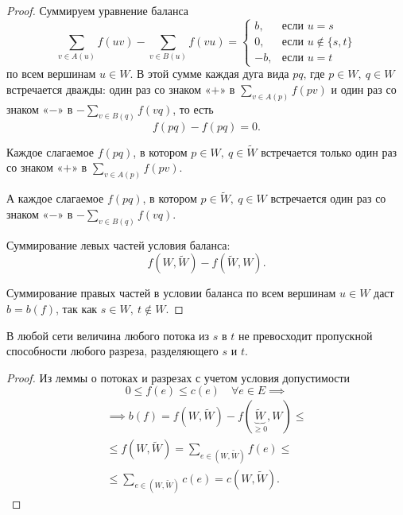 \begin{proof}
    Суммируем уравнение баланса
    \[
        \sum_{v\in A(u)}f(uv) - \sum_{v\in B(u)}f(vu) = \left\{\begin{array}{ll}
            b,  & \text{если }u = s            \\
            0,  & \text{если }u \notin \{s,t\} \\
            -b, & \text{если }u = t
        \end{array}\right.
    \]
    по всем вершинам $ u \in W $. В этой сумме каждая дуга вида $ pq $, где $ p \in W, \ q \in W $ встречается дважды: один раз со знаком «$+$» в $ \sum_{v \in A(p)}f(pv) $ и один раз со знаком «$-$» в $ -\sum_{v \in B(q)}f(vq) $, то есть
    \[
        f(pq) - f(pq) = 0.
    \]

    Каждое слагаемое $ f(pq) $, в котором $ p \in W, \ q \in \widetilde{W} $ встречается только один раз со знаком «$+$» в $ \sum_{v \in A(p)}f(pv) $.

    А каждое слагаемое $ f(pq) $, в котором $ p \in \widetilde{W}, \ q \in W $ встречается один раз со знаком «$-$» в $ -\sum_{v \in B(q)}f(vq) $.

    Суммирование левых частей условия баланса:
    \[
        f(W,\widetilde{W}) - f(\widetilde{W},W).
    \]

    Суммирование правых частей в условии баланса по всем вершинам $ u \in W $ даст $ b = b(f) $, так как $ s \in W, \ t \notin W $.
\end{proof}

\begin{corollary}
    В любой сети величина любого потока из $ s $ в $ t $ не превосходит пропускной способности любого разреза, разделяющего $ s $ и $ t $.
\end{corollary}

\begin{proof}
    Из леммы о потоках и разрезах с учетом условия допустимости
    \[
        0 \leqslant f(e) \leqslant c(e) \quad \forall e \in E \implies
    \]
    \begin{multline*}
        \implies b(f) = f(W,\widetilde{W}) - f(\underbrace{\widetilde{W}}_{\geqslant 0},W) \leqslant \\
        \leqslant f(W,\widetilde{W}) = \sum_{e \in (W,\widetilde{W})}f(e) \leqslant \\
        \leqslant \sum_{e \in (W,\widetilde{W})}c(e) = c(W,\widetilde{W}).
    \end{multline*}
\end{proof}

